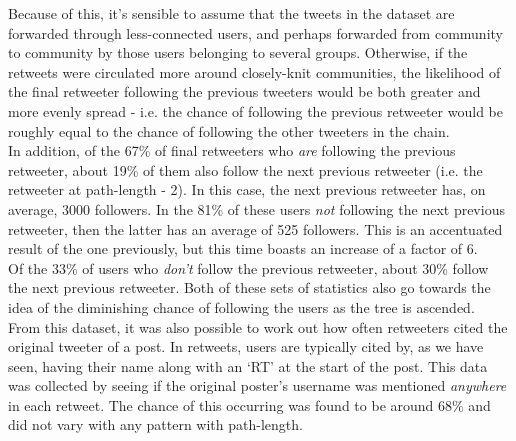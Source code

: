 Because of this, it's sensible to assume that the tweets in the dataset are forwarded through less-connected users, and perhaps forwarded from community to community by those users belonging to several groups. Otherwise, if the retweets were circulated more around closely-knit communities, the likelihood of the final retweeter following the previous tweeters would be both greater and more evenly spread - i.e. the chance of following the previous retweeter would be roughly equal to the chance of following the other tweeters in the chain.\\
In addition, of the 67\% of final retweeters who \textit{are} following the previous retweeter, about 19\% of them also follow the next previous retweeter (i.e. the retweeter at path-length - 2). In this case, the next previous retweeter has, on average, 3000 followers. In the 81\% of these users \textit{not} following the next previous retweeter, then the latter has an average of 525 followers. This is an accentuated result of the one previously, but this time boasts an increase of a factor of 6.\\
Of the 33\% of users who \textit{don't} follow the previous retweeter, about 30\% follow the next previous retweeter. Both of these sets of statistics also go towards the idea of the diminishing chance of following the users as the tree is ascended.\\
From this dataset, it was also possible to work out how often retweeters cited the original tweeter of a post. In retweets, users are typically cited by, as we have seen, having their name along with an `RT' at the start of the post. This data was collected by seeing if the original poster's username was mentioned \textit{anywhere} in each retweet. The chance of this occurring was found to be around 68\% and did not vary with any pattern with path-length.
 
